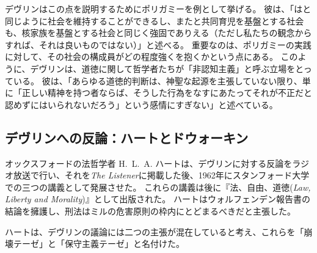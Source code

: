 \documentclass[paper=a4,book,openany]{jlreq}
\newcommand{\ig}[1]{}           %
\begin{document}
デヴリン\ig{Patrick Devlin}はこの点を説明するためにポリガミーを例として挙げる。
彼は、「はと同じように社会を維持することができるし、またと共同育児を基盤とする社会も、核家族を基盤とする社会と同じく強固でありえる（ただし私たちの観念からすれば、それは良いものではない）」と述べる\citep[p.114]{devlin65:_enfor_moral}。
重要なのは、ポリガミーの実践に対して、その社会の構成員がどの程度強くを抱くかという点にある。
このように、デヴリン\ig{Patrick Devlin}は、道徳に関して哲学者たちが「非認知主義」と呼ぶ立場をとっている。
彼は、「あらゆる道徳的判断は、神聖な起源を主張していない限り、単に「正しい精神を持つ者ならば、そうした行為をなすにあたってそれが不正だと認めずにはいられないだろう」という感情にすぎない」と述べている\citep[p.17]{devlin65:_enfor_moral}。

\subsection{デヴリンへの反論：ハートとドウォーキン}

オックスフォードの法哲学者 H.~L.~A. ハートは、デヴリン\ig{Patrick Devlin}に対する反論をラジオ放送で行い、それを\emph{The Listener}に掲載した後、1962年にスタンフォード大学での三つの講義として発展させた。
これらの講義は後に『法、自由、道徳(\emph{Law, Liberty and Morality})』として出版された。
ハートはウォルフェンデン報告書の結論を擁護し、刑法はミルの危害原則の枠内にとどまるべきだと主張した。

ハートは、デヴリン\ig{Patrick Devlin}の議論には二つの主張が混在していると考え、これらを「崩壊テーゼ」と「保守主義テーゼ」と名付けた\citep[p.115]{hart63:_law_liber_and_moral}。
\end{document}
